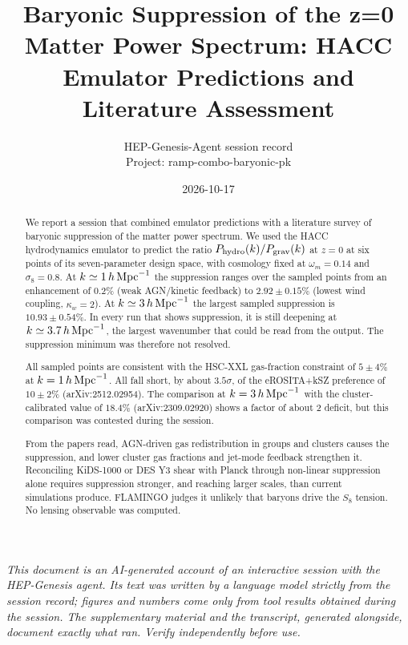 \documentclass[11pt,a4paper]{article}
\title{Baryonic Suppression of the z=0 Matter Power Spectrum: HACC Emulator Predictions and Literature Assessment}
\author{HEP-Genesis-Agent session record \\ \small Project: ramp-combo-baryonic-pk}
\date{2026-10-17}
\begin{document}
\maketitle
\noindent\textit{\small This document is an AI-generated account of an interactive session with the HEP-Genesis agent. Its text was written by a language model strictly from the session record; figures and numbers come only from tool results obtained during the session. The supplementary material and the transcript, generated alongside, document exactly what ran. Verify independently before use.}
\vspace{1em}

\begin{abstract}
We report a session that combined emulator predictions with a literature survey of baryonic suppression of the matter power spectrum. We used the HACC hydrodynamics emulator to predict the ratio $P_{\rm hydro}(k)/P_{\rm grav}(k)$ at $z=0$ at six points of its seven-parameter design space, with cosmology fixed at $\omega_m=0.14$ and $\sigma_8=0.8$. At $k\simeq1\,h\,{\rm Mpc}^{-1}$ the suppression ranges over the sampled points from an enhancement of $0.2\%$ (weak AGN/kinetic feedback) to $2.92\pm0.15\%$ (lowest wind coupling, $\kappa_w=2$). At $k\simeq3\,h\,{\rm Mpc}^{-1}$ the largest sampled suppression is $10.93\pm0.54\%$. In every run that shows suppression, it is still deepening at $k\simeq3.7\,h\,{\rm Mpc}^{-1}$, the largest wavenumber that could be read from the output. The suppression minimum was therefore not resolved.

All sampled points are consistent with the HSC-XXL gas-fraction constraint of $5\pm4\%$ at $k=1\,h\,{\rm Mpc}^{-1}$. All fall short, by about $3.5\sigma$, of the eROSITA+kSZ preference of $10\pm2\%$ (arXiv:2512.02954). The comparison at $k=3\,h\,{\rm Mpc}^{-1}$ with the cluster-calibrated value of $18.4\%$ (arXiv:2309.02920) shows a factor of about 2 deficit, but this comparison was contested during the session.

From the papers read, AGN-driven gas redistribution in groups and clusters causes the suppression, and lower cluster gas fractions and jet-mode feedback strengthen it. Reconciling KiDS-1000 or DES Y3 shear with Planck through non-linear suppression alone requires suppression stronger, and reaching larger scales, than current simulations produce. FLAMINGO judges it unlikely that baryons drive the $S_8$ tension. No lensing observable was computed.
\end{abstract}
\end{document}
